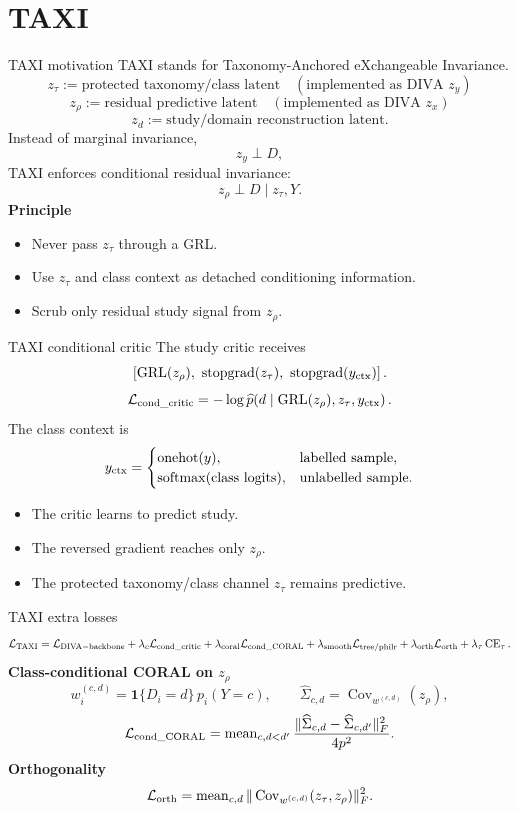 \documentclass[aspectratio=169,10pt]{beamer}
\newcommand{\softmax}{\operatorname{softmax}}
\newcommand{\CE}{\operatorname{CE}}
\begin{document}
\section{TAXI}

\begin{frame}{TAXI motivation}
\small
TAXI stands for Taxonomy-Anchored eXchangeable Invariance.
\[
z_\tau := \text{protected taxonomy/class latent}\quad(\text{implemented as DIVA }z_y)
\]
\[
z_\rho := \text{residual predictive latent}\quad(\text{implemented as DIVA }z_x)
\]
\[
z_d := \text{study/domain reconstruction latent}.
\]
Instead of marginal invariance,
\[
z_y\perp D,
\]
TAXI enforces conditional residual invariance:
\[
z_\rho \perp D \mid z_\tau,Y.
\]
\textbf{Principle}
\begin{itemize}
  \item Never pass \(z_\tau\) through a GRL.
  \item Use \(z_\tau\) and class context as detached conditioning information.
  \item Scrub only residual study signal from \(z_\rho\).
\end{itemize}
\end{frame}

\begin{frame}{TAXI conditional critic}
\small
The study critic receives
\[
\left[\operatorname{GRL}(z_\rho),\ \operatorname{stopgrad}(z_\tau),\
\operatorname{stopgrad}(y_{\rm ctx})\right].
\]
\[
\mathcal L_{\rm cond\_critic}
=
-\log \widehat p\!\left(d\mid
\operatorname{GRL}(z_\rho),z_\tau,y_{\rm ctx}\right).
\]
The class context is
\[
y_{\rm ctx}=
\begin{cases}
\operatorname{onehot}(y), & \text{labelled sample},\\
\softmax(\text{class logits}), & \text{unlabelled sample}.
\end{cases}
\]
\begin{itemize}
  \item The critic learns to predict study.
  \item The reversed gradient reaches only \(z_\rho\).
  \item The protected taxonomy/class channel \(z_\tau\) remains predictive.
\end{itemize}
\end{frame}

\begin{frame}{TAXI extra losses}
\small
\[
\mathcal L_{\rm TAXI}
=\mathcal L_{\rm DIVA-backbone}
+\lambda_c\mathcal L_{\rm cond\_critic}
+\lambda_{\rm coral}\mathcal L_{\rm cond\_CORAL}
+\lambda_{\rm smooth}\mathcal L_{\rm tree/philr}
+\lambda_{\rm orth}\mathcal L_{\rm orth}
+\lambda_\tau\CE_\tau.
\]
\textbf{Class-conditional CORAL on \(z_\rho\)}
\[
w_i^{(c,d)}=\mathbf 1\{D_i=d\}\,p_i(Y=c),
\qquad
\widehat\Sigma_{c,d}=\operatorname{Cov}_{w^{(c,d)}}(z_\rho),
\]
\[
\mathcal L_{\rm cond\_CORAL}
=
\operatorname{mean}_{c,d<d'}
\frac{\|\widehat\Sigma_{c,d}-\widehat\Sigma_{c,d'}\|_F^2}{4p^2}.
\]
\textbf{Orthogonality}
\[
\mathcal L_{\rm orth}
=
\operatorname{mean}_{c,d}
\|\operatorname{Cov}_{w^{(c,d)}}(z_\tau,z_\rho)\|_F^2.
\]
\end{frame}
\end{document}
